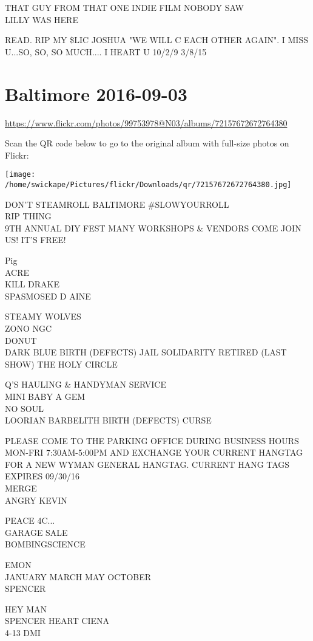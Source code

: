 \documentclass[10pt,letterpaper]{article}
\begin{document}
THAT GUY FROM THAT ONE INDIE FILM NOBODY SAW\\
LILLY WAS HERE

READ.  RIP MY \$LIC JOSHUA "WE WILL C EACH OTHER AGAIN".  I MISS U...SO, SO, SO MUCH.... I HEART U 10/2/9 3/8/15


\section*{Baltimore 2016-09-03}

\url{https://www.flickr.com/photos/99753978@N03/albums/72157672672764380}

Scan the QR code below to go to the original album with full-size photos on Flickr:

\texttt{[image: /home/swickape/Pictures/flickr/Downloads/qr/72157672672764380.jpg]}


DON'T STEAMROLL BALTIMORE \#SLOWYOURROLL\\
RIP THING\\
9TH ANNUAL DIY FEST MANY WORKSHOPS \& VENDORS COME JOIN US!  IT'S FREE!

Pig\\
ACRE\\
KILL DRAKE\\
SPASMOSED D AINE

STEAMY WOLVES\\
ZONO NGC\\
DONUT\\
DARK BLUE BIRTH (DEFECTS) JAIL SOLIDARITY RETIRED (LAST SHOW) THE HOLY CIRCLE

Q'S HAULING \& HANDYMAN SERVICE\\
MINI BABY A GEM\\
NO SOUL\\
LOORIAN BARBELITH BIRTH (DEFECTS) CURSE

PLEASE COME TO THE PARKING OFFICE DURING BUSINESS HOURS MON{-}FRI 7:30AM{-}5:00PM AND EXCHANGE YOUR CURRENT HANGTAG FOR A NEW WYMAN GENERAL HANGTAG.  CURRENT HANG TAGS EXPIRES 09/30/16\\
MERGE\\
ANGRY KEVIN

PEACE 4C...\\
GARAGE SALE\\
BOMBINGSCIENCE

EMON\\
JANUARY MARCH MAY OCTOBER\\
SPENCER

HEY MAN\\
SPENCER HEART CIENA\\
4{-}13 DMI
\end{document}
